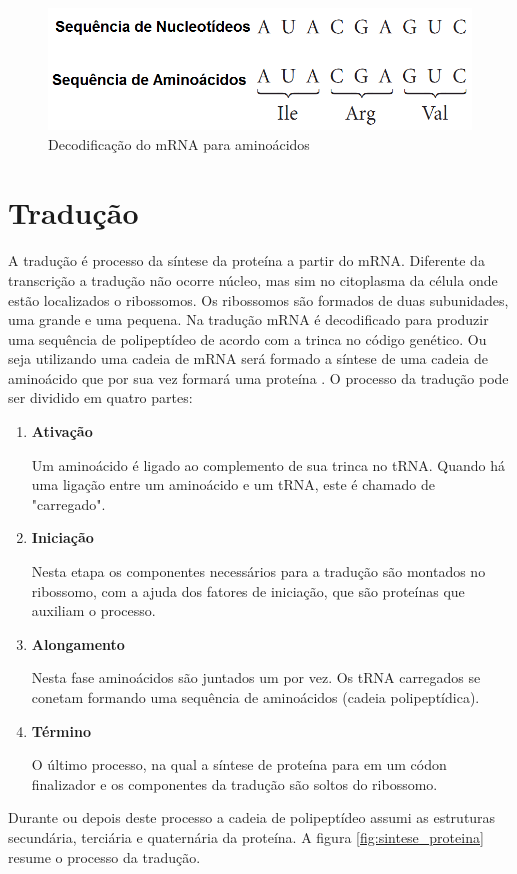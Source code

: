 \begin{figure}[htb!]
    \centering
    \includegraphics[scale=0.7]{./figuras/mRNA_to_codon.png}
    \caption{Decodificação do mRNA para aminoácidos}
    \label{fig:mRNA_to_codon}
\end{figure}


\section{Tradução} \label{traducao}
A tradução é processo da síntese da proteína a partir do mRNA. Diferente da transcrição a tradução não ocorre núcleo, mas sim no citoplasma da célula onde estão localizados o ribossomos. Os ribossomos são formados de duas subunidades, uma grande e uma pequena. Na tradução mRNA é decodificado para produzir uma sequência de polipeptídeo de acordo com a trinca no código genético. Ou seja utilizando uma cadeia de mRNA será formado a síntese de uma cadeia de aminoácido que por sua vez formará uma proteína \cite{Simmons2003}. O processo da tradução pode ser dividido em quatro partes: 
\begin{enumerate}

\item  \textbf{Ativação}

Um aminoácido é ligado ao complemento de sua trinca no tRNA. Quando há uma ligação entre um aminoácido e um tRNA, este é chamado de "carregado".
\item \textbf{Iniciação}

Nesta etapa os componentes necessários para a tradução são montados no ribossomo, com a ajuda dos fatores de iniciação, que são proteínas que auxiliam o processo.

\item \textbf{Alongamento}

Nesta fase aminoácidos são juntados um por vez. Os tRNA carregados se conetam formando uma sequência de aminoácidos (cadeia polipeptídica).

\item \textbf{Término}

O último processo, na qual a síntese de proteína para em um códon finalizador e os componentes da tradução são soltos do ribossomo.
\end{enumerate}
Durante ou depois deste processo a cadeia de polipeptídeo assumi as estruturas secundária, terciária e quaternária da proteína. A figura \ref{fig:sintese_proteina} resume o processo da tradução.

